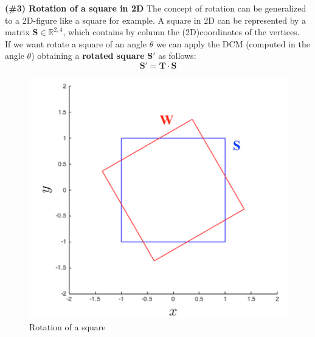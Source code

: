 \noindent
{\color{blue} \textbf{(\#3) Rotation of a square in 2D}}
The concept of rotation can be generalized to a 2D-figure like a square for example. A square in 2D can be represented by a matrix $\mathbf{S}\in\mathbb{R}^{2,4}$, which contains by column the (2D)coordinates of the vertices.\\
If we want rotate a square of an angle $\theta$ we can apply the DCM (computed in the angle $\theta$) obtaining a \textbf{rotated square} $\mathbf{S'}$ as follows:
\begin{equation*}
    \mathbf{S'} = \mathbf{T} \cdot \mathbf{S}
\end{equation*}

\begin{figure}[h]
    \centering
    \includegraphics[scale=1]{AerospaceApplications/images/square_rot.png}
    \caption{Rotation of a square}
\end{figure}

